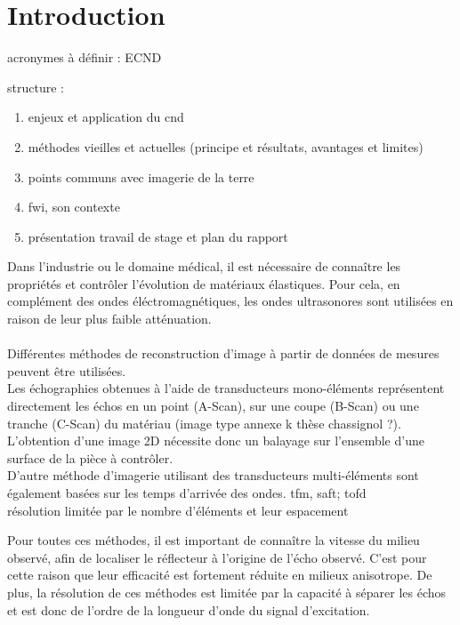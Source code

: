 \chapter{Introduction}

acronymes à définir :
ECND



structure :
\begin{enumerate}
	\item enjeux et application du cnd
	\item méthodes vieilles et actuelles (principe et résultats, avantages et limites)
	\item points communs avec imagerie de la terre
	\item fwi, son contexte
	\item présentation travail de stage et plan du rapport
\end{enumerate}



Dans l'industrie ou le domaine médical, il est nécessaire de connaître les propriétés et contrôler l'évolution de matériaux élastiques. Pour cela, en complément des ondes éléctromagnétiques,  les ondes ultrasonores sont utilisées en raison de leur plus faible atténuation.\\~\\


Différentes méthodes de reconstruction d'image à partir de données de mesures peuvent être utilisées.\\

Les échographies obtenues à l'aide de transducteurs mono-éléments représentent directement les échos en un point (A-Scan), sur une coupe (B-Scan) ou une tranche (C-Scan) du matériau (image type annexe k thèse chassignol ?). L'obtention d'une image 2D nécessite donc un balayage sur l'ensemble d'une surface de la pièce à contrôler. \\

D'autre méthode d'imagerie utilisant des transducteurs multi-éléments sont également basées sur les temps d'arrivée des ondes.  tfm, saft; tofd\\
résolution limitée par le nombre d'éléments et leur espacement


Pour toutes ces méthodes, il est important de connaître la vitesse du milieu observé, afin de localiser le réflecteur à l'origine de l'écho observé. C'est pour cette raison que leur efficacité est fortement réduite en milieux anisotrope.  
De plus, la résolution de ces méthodes est limitée par la capacité à séparer les échos et est donc de l'ordre de la longueur d'onde du signal d'excitation. \\


